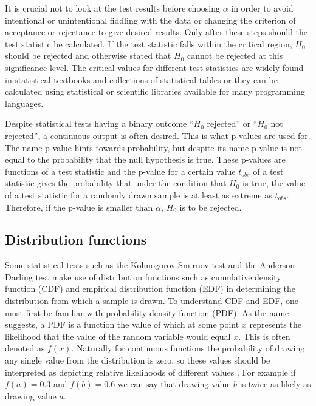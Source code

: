 \documentclass[english, twoside]{HYgradu}
\begin{document}
It is crucial not to look at the test results before choosing $\alpha$ in order to avoid intentional or unintentional fiddling with the data or changing the criterion of acceptance or rejectance to give desired results. Only after these steps should the test statistic be calculated. If the test statistic falls within the critical region, $H_0$ should be rejected and otherwise stated that $H_0$ cannot be rejected at this significance level. The critical values for different test statistics are widely found in statistical textbooks and collections of statistical tables or they can be calculated using statistical or scientific libraries available for many programming languages.

Despite statistical tests having a binary outcome ``$H_0$ rejected'' or ``$H_0$ not rejected'', a continuous output is often desired. This is what p-values are used for. The name p-value hints towards probability, but despite its name p-value is not equal to the probability that the null hypothesis is true. These p-values are functions of a test statistic and the p-value for a certain value $t_{obs}$ of a test statistic gives the probability that under the condition that $H_0$ is true, the value of a test statistic for a randomly drawn sample is at least as extreme as $t_{obs}$. Therefore, if the p-value is smaller than $\alpha$, $H_0$ is to be rejected.

\subsection{Distribution functions} \label{sect:distribution-functions}
Some statistical tests such as the Kolmogorov-Smirnov test and the Anderson-Darling test make use of distribution functions such as cumulative density function (CDF) and empirical distribution function (EDF) in determining the distribution from which a sample is drawn. To understand CDF and EDF, one must first be familiar with probability density function (PDF).
As the name suggests, a PDF is a function the value of which at some point $x$ represents the likelihood that the value of the random variable would equal $x$. This is often denoted as $f(x)$. Naturally for continuous functions the probability of drawing any single value from the distribution is zero, so these values should be interpreted as depicting relative likelihoods of different values \citep{htk}. For example if $f(a)=0.3$ and $f(b)=0.6$ we can say that drawing value $b$ is twice as likely as drawing value $a$.
\end{document}
